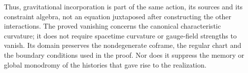 Thus, gravitational incorporation is part of the same action, its sources and its constraint algebra, not an equation juxtaposed after constructing the other interactions. The proved vanishing concerns the canonical characteristic curvature; it does not require spacetime curvature or gauge-field strengths to vanish. Its domain preserves the nondegenerate coframe, the regular chart and the boundary conditions used in the proof. Nor does it suppress the memory or global monodromy of the histories that gave rise to the realization.
